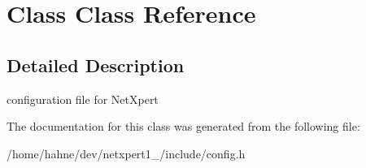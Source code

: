 \hypertarget{classClass}{}\section{Class Class Reference}
\label{classClass}


\subsection{Detailed Description}
configuration file for Net\+Xpert 

The documentation for this class was generated from the following file\+:\begin{DoxyCompactItemize}
\item 
/home/hahne/dev/netxpert1\+\_/include/config.\+h\end{DoxyCompactItemize}
